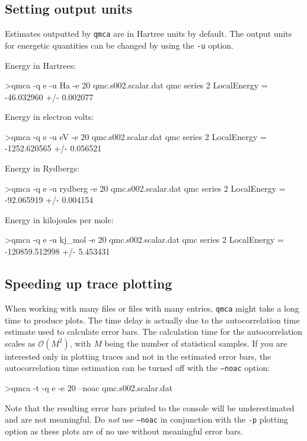 \subsection{Setting output units}
\label{sec:qmca_output_units}
Estimates outputted by \texttt{qmca} are in Hartree units by 
default.  The output units for energetic quantities can be 
changed by using the \texttt{-u} option.  

\vspace{3mm}
\noindent
Energy in Hartrees:
\begin{shade}
>qmca -q e -u Ha -e 20 qmc.s002.scalar.dat
qmc  series 2  LocalEnergy           =  -46.032960 +/- 0.002077
\end{shade}

\noindent
Energy in electron volts:
\begin{shade}
>qmca -q e -u eV -e 20 qmc.s002.scalar.dat
qmc  series 2  LocalEnergy           =  -1252.620565 +/- 0.056521 
\end{shade}

\noindent
Energy in Rydbergs:
\begin{shade}
>qmca -q e -u rydberg -e 20 qmc.s002.scalar.dat
qmc  series 2  LocalEnergy           =  -92.065919 +/- 0.004154   
\end{shade}

\noindent
Energy in kilojoules per mole:
\begin{shade}
>qmca -q e -u kj_mol -e 20 qmc.s002.scalar.dat
qmc  series 2  LocalEnergy           =  -120859.512998 +/- 5.453431   
\end{shade}


\subsection{Speeding up trace plotting}
\label{sec:qmca_fast_trace_plot}
When working with many files or files with many entries, 
\texttt{qmca} might take a long time to produce plots.  The time 
delay is actually due to the autocorrelation time estimate 
used to calculate error bars.  The calculation time for 
the autocorrelation scales as $\mathcal{O}(M^2)$, with $M$ being 
the number of statistical samples.  If you are interested only 
in plotting traces and not in the estimated error bars, the 
autocorrelation time estimation can be turned off with the 
\texttt{--noac} option:
\begin{shade}
>qmca -t -q e -e 20 --noac qmc.s002.scalar.dat
\end{shade}
\noindent
Note that the resulting error bars printed to the console 
will be underestimated and are not meaningful.  Do \emph{not} 
use \texttt{--noac} in conjunction with the \texttt{-p} 
plotting option as these plots are of no use without meaningful 
error bars.


